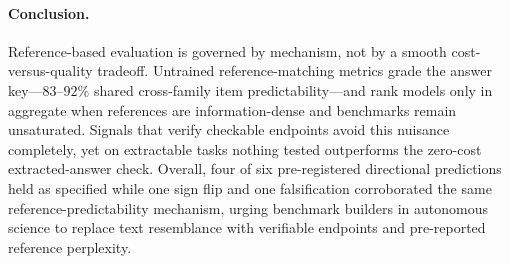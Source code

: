 \paragraph{Conclusion.}
Reference-based evaluation is governed by mechanism, not by a smooth cost-versus-quality tradeoff.
Untrained reference-matching metrics grade the answer key---$83$--$92\%$ shared cross-family item predictability---and rank models only in aggregate when references are information-dense and benchmarks remain unsaturated.
Signals that verify checkable endpoints avoid this nuisance completely, yet on extractable tasks nothing tested outperforms the zero-cost extracted-answer check.
Overall, four of six pre-registered directional predictions held as specified while one sign flip and one falsification corroborated the same reference-predictability mechanism, urging benchmark builders in autonomous science to replace text resemblance with verifiable endpoints and pre-reported reference perplexity.
